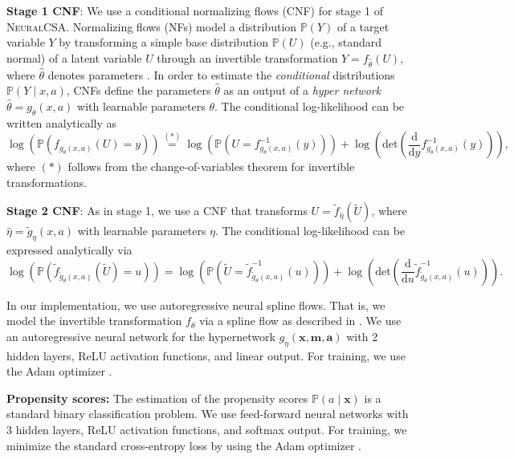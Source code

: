\documentclass{article} %
\newcommand{\frameworkname}{\textsc{NeuralCSA}\xspace}
\theoremstyle{definition}
\theoremstyle{plain}
\begin{document}
\textbf{Stage 1 CNF}: We use a conditional normalizing flows (CNF) \cite{Winkler.2019} for stage 1 of \frameworkname. Normalizing flows (NFs) model a distribution $\mathbb{P}(Y)$ of a target variable $Y$ by transforming a simple base distribution $\mathbb{P}(U)$ (e.g., standard normal) of a latent variable $U$ through an invertible transformation $Y = f_{\hat{\theta}}(U)$, where $\hat{\theta}$ denotes parameters \cite{Rezende.2015}. In order to estimate the  \emph{conditional} distributions $\mathbb{P}(Y \mid x, a)$, CNFs define the parameters $\hat{\theta}$ as an output of a \emph{hyper network} $\hat{\theta} = g_\theta(x, a)$ with learnable parameters $\theta$. The conditional log-likelihood can be written analytically as
\begin{equation}
 \log \left( \mathbb{P} (f_{g_\theta(x, a)}(U) = y) \right) 
 \overset{(\ast)}{=} \log \left(\mathbb{P} \left(U = f_{g_\theta(x, a)}^{-1}(y)\right) \right) + \log\left(\mathrm{det} \left( \frac{\mathrm{d}}{\mathrm{d} y} f_{g_\theta(x, a)}^{-1}(y)\right)\right),
\end{equation}
where $(\ast)$ follows from the change-of-variables theorem for invertible transformations.

\textbf{Stage 2 CNF}: As in stage 1, we use a CNF that transforms $U = \widetilde{f}_{\hat{\eta}}(\widetilde{U})$, where $\hat{\eta} = \widetilde{g}_\eta(x, a)$ with learnable parameters $\eta$. The conditional log-likelihood can be expressed analytically via
\begin{equation}
 \log \left( \mathbb{P} (\widetilde{f}_{\widetilde{g}_\theta(x, a)}(\widetilde{U}) = u) \right) = \log \left(\mathbb{P} \left(\widetilde{U} = \widetilde{f}_{\widetilde{g}_\theta(x, a)}^{-1}(u)\right) \right) + \log\left(\mathrm{det} \left( \frac{\mathrm{d}}{\mathrm{d} u} \widetilde{f}_{\widetilde{g}_\theta(x, a)}^{-1}(u)\right)\right).   
\end{equation}

In our implementation, we use autoregressive neural spline flows. That is, we model the invertible transformation $f_{\theta}$ via a spline flow as described in \cite{Dolatabadi.2020}. We use an autoregressive neural network for the hypernetwork $g_\eta(\mathbf{x}, \mathbf{m}, \mathbf{a})$ with 2 hidden layers, ReLU activation functions, and linear output. For training, we use the Adam optimizer \cite{Kingma.2015}.

\textbf{Propensity scores:} The estimation of the propensity scores $\mathbb{P}(a \mid \mathbf{x})$ is a standard binary classification problem. We use feed-forward neural networks with 3 hidden layers, ReLU activation functions, and softmax output. For training, we minimize the standard cross-entropy loss by using the Adam optimizer \cite{Kingma.2015}.
\end{document}
